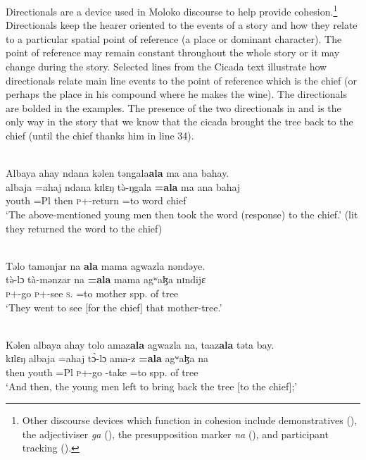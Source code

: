 Directionals are a device used in Moloko discourse to help provide cohesion.\footnote{Other discourse devices which function in cohesion include demonstratives (), the adjectiviser  \textit{ga} (), the presupposition marker \textit{na} (), and participant tracking ().} Directionals keep the hearer oriented to the events of a story and how they relate to a particular spatial point of reference (a place or dominant character). The point of reference may remain constant throughout the whole story or it may change during the story. Selected lines from the Cicada text  illustrate how directionals relate main line events to the point of reference which is the chief (or perhaps the place in his compound where he makes the wine). The directionals are bolded in the examples. The presence of the two directionals in  and  is the only way in the story that we know that the cicada brought the tree back to the chief (until the chief thanks him in line 34).


\ea\label{ex:7:116}\\
Albaya  ahay  ndana  kəlen  təngala\textbf{ala}  ma  ana  bahay.\\
\gll  albaja =ahaj  ndana  kɪlɛŋ  t\`ə-ŋgala    \textbf{=ala}  ma  ana  bahaj\\
      youth  =Pl  {\DEM}  then  \textsc{p}+{\PFV}-return  =to    word    {\DAT}   chief\\
\glt  ‘The above-mentioned young men then took the word (response) to the chief.’ (lit they returned the word to the chief)\\
\z 

\ea\label{ex:7:117}\\
Təlo  tamənjar  na \textbf{ ala}  mama  agwazla  nəndəye.\\
\gll  t\`ə-lɔ          tà-mənzar     na      \textbf{=ala}     mama      agʷaɮa     nɪndijɛ\\
      \textsc{p}+{\PFV}-go   \textsc{p}+{\HOR}-see    \textsc{s}.{\DO}   =to     mother       {spp. of tree}    {\DEM}\\
\glt  ‘They went to see [for the chief] that mother-tree.'\\
\z 

\ea\label{ex:7:118}\\
Kəlen  albaya  ahay  tolo  amaz\textbf{ala}  agwazla  na,  taaz\textbf{ala}  təta  bay.\\
\gll  kɪlɛŋ   albaja    =ahaj    t\`ɔ-lɔ ama-z \textbf{=ala}  agʷaɮa  na \\ 
      then   youth      =Pl      \textsc{p}+{\PFV}-go  {\DEP}-take  =to       {spp. of tree}  {\PSP} \\
\glt ‘And then, the young men left to bring back the tree [to the chief];’\\
      

